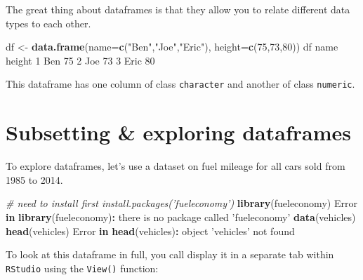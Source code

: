 \documentclass[]{book}
\newenvironment{Shaded}{\begin{snugshade}}{\end{snugshade}}
\newcommand{\CommentTok}[1]{\textcolor[rgb]{0.56,0.35,0.01}{\textit{#1}}}
\newcommand{\ControlFlowTok}[1]{\textcolor[rgb]{0.13,0.29,0.53}{\textbf{#1}}}
\newcommand{\DataTypeTok}[1]{\textcolor[rgb]{0.13,0.29,0.53}{#1}}
\newcommand{\DecValTok}[1]{\textcolor[rgb]{0.00,0.00,0.81}{#1}}
\newcommand{\KeywordTok}[1]{\textcolor[rgb]{0.13,0.29,0.53}{\textbf{#1}}}
\newcommand{\NormalTok}[1]{#1}
\newcommand{\OperatorTok}[1]{\textcolor[rgb]{0.81,0.36,0.00}{\textbf{#1}}}
\newcommand{\StringTok}[1]{\textcolor[rgb]{0.31,0.60,0.02}{#1}}
\begin{document}
The great thing about dataframes is that they allow you to relate different data types to each other.

\begin{Shaded}
\begin{Highlighting}[]
\NormalTok{df <-}\StringTok{ }\KeywordTok{data.frame}\NormalTok{(}\DataTypeTok{name=}\KeywordTok{c}\NormalTok{(}\StringTok{"Ben"}\NormalTok{,}\StringTok{"Joe"}\NormalTok{,}\StringTok{"Eric"}\NormalTok{),}
                 \DataTypeTok{height=}\KeywordTok{c}\NormalTok{(}\DecValTok{75}\NormalTok{,}\DecValTok{73}\NormalTok{,}\DecValTok{80}\NormalTok{))}
\NormalTok{df}
\NormalTok{  name height}
\DecValTok{1}\NormalTok{  Ben     }\DecValTok{75}
\DecValTok{2}\NormalTok{  Joe     }\DecValTok{73}
\DecValTok{3}\NormalTok{ Eric     }\DecValTok{80}
\end{Highlighting}
\end{Shaded}

This dataframe has one column of class \texttt{character} and another of class \texttt{numeric}.

\hypertarget{subsetting-exploring-dataframes}{%
\section*{Subsetting \& exploring dataframes}\label{subsetting-exploring-dataframes}}

To explore dataframes, let's use a dataset on fuel mileage for all cars sold from 1985 to 2014.

\begin{Shaded}
\begin{Highlighting}[]
\CommentTok{# need to install first install.packages('fueleconomy')}
\KeywordTok{library}\NormalTok{(fueleconomy)}
\NormalTok{Error }\ControlFlowTok{in} \KeywordTok{library}\NormalTok{(fueleconomy)}\OperatorTok{:}\StringTok{ }\NormalTok{there is no package called }\StringTok{'fueleconomy'}
\KeywordTok{data}\NormalTok{(vehicles)}
\KeywordTok{head}\NormalTok{(vehicles)}
\NormalTok{Error }\ControlFlowTok{in} \KeywordTok{head}\NormalTok{(vehicles)}\OperatorTok{:}\StringTok{ }\NormalTok{object }\StringTok{'vehicles'}\NormalTok{ not found}
\end{Highlighting}
\end{Shaded}

To look at this dataframe in full, you call display it in a separate tab within \texttt{RStudio} using the \texttt{View()} function:
\end{document}
